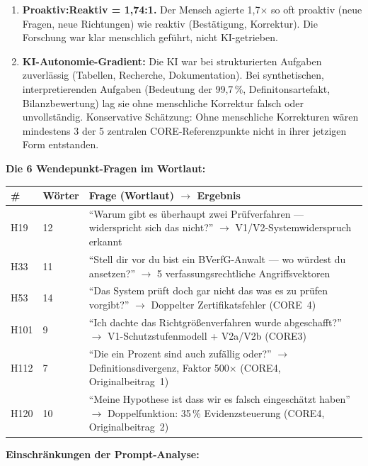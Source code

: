 \documentclass{umbruch-position}
\begin{document}
\begin{enumerate}[nosep]
  \item \textbf{Proaktiv:Reaktiv = 1,74:1.} Der Mensch agierte 1,7$\times$ so oft proaktiv (neue Fragen, neue Richtungen) wie reaktiv (Bestätigung, Korrektur). Die Forschung war klar menschlich geführt, nicht KI-getrieben.

  \item \textbf{KI-Autonomie-Gradient:} Die KI war bei strukturierten Aufgaben zuverlässig (Tabellen, Recherche, Dokumentation). Bei synthetischen, interpretierenden Aufgaben (Bedeutung der 99,7\,\%, Definitonsartefakt, Bilanzbewertung) lag sie ohne menschliche Korrektur falsch oder unvollständig. Konservative Schätzung: Ohne menschliche Korrekturen wären mindestens 3 der 5 zentralen CORE-Referenzpunkte nicht in ihrer jetzigen Form entstanden.
\end{enumerate}

\noindent\textbf{Die 6 Wendepunkt-Fragen im Wortlaut:}

{\small
\begin{tabularx}{\textwidth}{l l X}
\toprule
\textbf{\#} & \textbf{Wörter} & \textbf{Frage (Wortlaut) $\to$ Ergebnis} \\
\midrule
H19 & 12 & ``Warum gibt es überhaupt zwei Prüfverfahren --- widerspricht sich das nicht?'' $\to$ V1/V2-Systemwiderspruch erkannt \\
\addlinespace
H33 & 11 & ``Stell dir vor du bist ein BVerfG-Anwalt --- wo würdest du ansetzen?'' $\to$ 5 verfassungsrechtliche Angriffsvektoren \\
\addlinespace
H53 & 14 & ``Das System prüft doch gar nicht das was es zu prüfen vorgibt?'' $\to$ Doppelter Zertifikatsfehler (CORE~4) \\
\addlinespace
H101 & 9 & ``Ich dachte das Richtgrößenverfahren wurde abgeschafft?'' $\to$ V1-Schutzstufenmodell + V2a/V2b (CORE3) \\
\addlinespace
H112 & 7 & ``Die ein Prozent sind auch zufällig oder?'' $\to$ Definitionsdivergenz, Faktor 500$\times$ (CORE4, Originalbeitrag~1) \\
\addlinespace
H120 & 10 & ``Meine Hypothese ist dass wir es falsch eingeschätzt haben'' $\to$ Doppelfunktion: 35\,\% Evidenzsteuerung (CORE4, Originalbeitrag~2) \\
\bottomrule
\end{tabularx}
}

\medskip
\noindent\textbf{Einschränkungen der Prompt-Analyse:}
\end{document}
